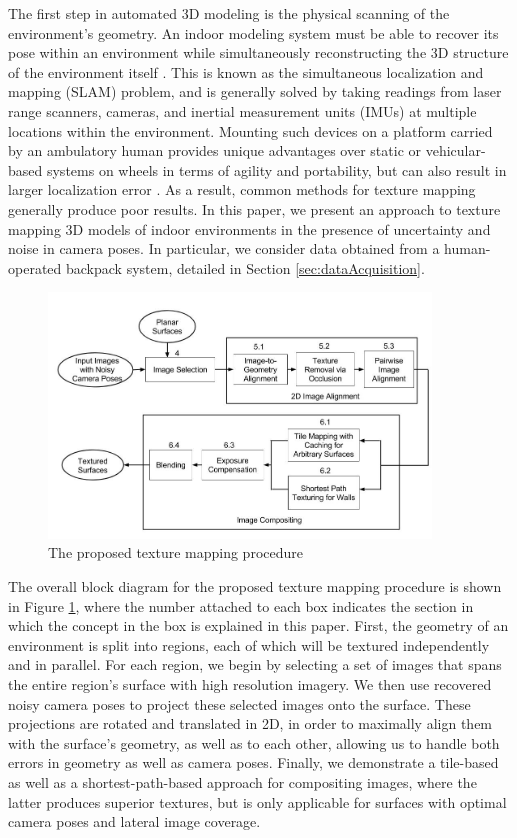 \documentclass[]{spie}  %
\begin{document}
The first step in automated 3D modeling is the physical scanning of
the environment's geometry. An indoor modeling system must be able to
recover its pose within an environment while simultaneously
reconstructing the 3D structure of the environment itself
\cite{chen2010indoor, hz, kua2012loopclosure, liu2010indoor}. This is
known as the simultaneous localization and mapping (SLAM) problem, and
is generally solved by taking readings from laser range scanners,
cameras, and inertial measurement units (IMUs) at multiple locations
within the environment. Mounting such devices on a platform carried by
an ambulatory human provides unique advantages over static or
vehicular-based systems on wheels in terms of agility and portability,
but can also result in larger localization error
\cite{liu2010indoor}. As a result, common methods for texture mapping
generally produce poor results. In this paper, we present an approach
to texture mapping 3D models of indoor environments in the presence of
uncertainty and noise in camera poses. In particular, we consider data
obtained from a human-operated backpack system, detailed in Section
\ref{sec:dataAcquisition}.


\begin{figure}
  \centering
  \includegraphics[width=4in]{flowchart.jpg}
  \caption{The proposed texture mapping procedure\\}
  \label{fig:flowchart}
\end{figure}


The overall block diagram for the proposed texture mapping procedure
is shown in Figure \ref{fig:flowchart}, where the number attached to
each box indicates the section in which the concept in the box is
explained in this paper. First, the geometry of an environment is
split into regions, each of which will be textured independently and
in parallel. For each region, we begin by selecting a set of images
that spans the entire region's surface with high resolution
imagery. We then use recovered noisy camera poses to project these
selected images onto the surface. These projections are rotated and
translated in 2D, in order to maximally align them with the surface's
geometry, as well as to each other, allowing us to handle both errors
in geometry as well as camera poses. Finally, we demonstrate a
tile-based as well as a shortest-path-based approach for compositing
images, where the latter produces superior textures, but is only
applicable for surfaces with optimal camera poses and lateral image
coverage.
\end{document}
